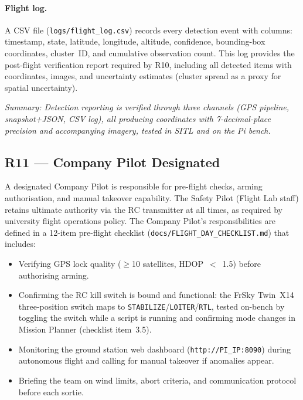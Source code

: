 \paragraph{Flight log.} A CSV file (\texttt{logs/flight\_log.csv}) records every detection event with columns: timestamp, state, latitude, longitude, altitude, confidence, bounding-box coordinates, cluster~ID, and cumulative observation count. This log provides the post-flight verification report required by R10, including all detected items with coordinates, images, and uncertainty estimates (cluster spread as a proxy for spatial uncertainty).

\noindent\textit{Summary: Detection reporting is verified through three channels (GPS pipeline, snapshot+JSON, CSV log), all producing coordinates with 7-decimal-place precision and accompanying imagery, tested in SITL and on the Pi bench.}

\subsection{R11 --- Company Pilot Designated}

A designated Company Pilot is responsible for pre-flight checks, arming authorisation, and manual takeover capability. The Safety Pilot (Flight Lab staff) retains ultimate authority via the RC transmitter at all times, as required by university flight operations policy. The Company Pilot's responsibilities are defined in a 12-item pre-flight checklist (\texttt{docs/FLIGHT\_DAY\_CHECKLIST.md}) that includes:

\begin{itemize}
    \item Verifying GPS lock quality ($\geq$10 satellites, HDOP~$<$~1.5) before authorising arming.
    \item Confirming the RC kill switch is bound and functional: the FrSky Twin~X14 three-position switch maps to \texttt{STABILIZE}/\texttt{LOITER}/\texttt{RTL}, tested on-bench by toggling the switch while a script is running and confirming mode changes in Mission Planner (checklist item~3.5).
    \item Monitoring the ground station web dashboard (\texttt{http://PI\_IP:8090}) during autonomous flight and calling for manual takeover if anomalies appear.
    \item Briefing the team on wind limits, abort criteria, and communication protocol before each sortie.
\end{itemize}

